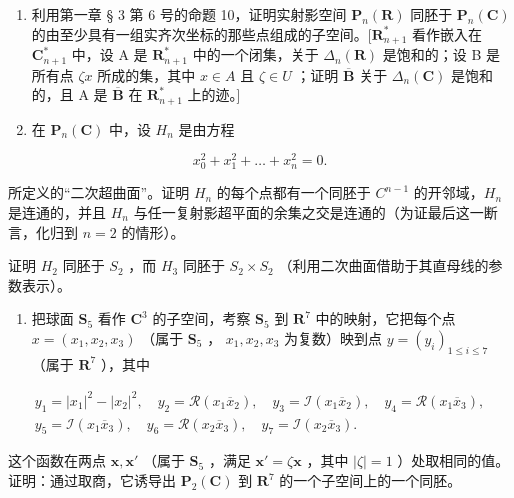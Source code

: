 \begin{enumerate}
\def\labelenumi{\arabic{enumi})}
\setcounter{enumi}{2}
\item
  利用第一章 § 3 第 6 号的命题 10，证明实射影空间 \(\mathbf{P}_{n}(\mathbf{R})\) 同胚于 \(\mathbf{P}_{n}(\mathbf{C})\) 的由至少具有一组实齐次坐标的那些点组成的子空间。\([\mathbf{R}_{n+1}^{*}\) 看作嵌入在 \(\mathbf{C}_{n+1}^{*}\) 中，设 A 是 \(\mathbf{R}_{n+1}^{*}\) 中的一个闭集，关于 \(\Delta_{n}(\mathbf{R})\) 是饱和的；设 B 是所有点 \(\zeta x\) 所成的集，其中 \(x \in A\) 且 \(\zeta \in U\) ；证明 \(\overline{\mathbf{B}}\) 关于 \(\Delta_{n}(\mathbf{C})\) 是饱和的，且 A 是 \(\overline{\mathbf{B}}\) 在 \(\mathbf{R}_{n+1}^{*}\) 上的迹。{]}
\item
  在 \(\mathbf{P}_{n}(\mathbf{C})\) 中，设 \(H_{n}\) 是由方程
\end{enumerate}

\[
x _ {0} ^ {2} + x _ {1} ^ {2} + \dots + x _ {n} ^ {2} = 0.
\]

所定义的“二次超曲面”。证明 \(H_{n}\) 的每个点都有一个同胚于 \(C^{n-1}\) 的开邻域，\(H_{n}\) 是连通的，并且 \(H_{n}\) 与任一复射影超平面的余集之交是连通的（为证最后这一断言，化归到 \(n = 2\) 的情形）。

证明 \(H_{2}\) 同胚于 \(S_{2}\) ，而 \(H_{3}\) 同胚于 \(S_{2} \times S_{2}\) （利用二次曲面借助于其直母线的参数表示）。

\begin{enumerate}
\def\labelenumi{\arabic{enumi})}
\setcounter{enumi}{4}
\tightlist
\item
  把球面 \(\mathbf{S}_5\) 看作 \(\mathbf{C}^3\) 的子空间，考察 \(\mathbf{S}_5\) 到 \(\mathbf{R}^7\) 中的映射，它把每个点 \(x = (x_1, x_2, x_3)\) （属于 \(\mathbf{S}_5\) ， \(x_1, x_2, x_3\) 为复数）映到点 \(y = (y_i)_{1 \leqslant i \leqslant 7}\) （属于 \(\mathbf{R}^7\) ），其中
\end{enumerate}

\[
\begin{array}{c} y _ {1} = | x _ {1} | ^ {2} - | x _ {2} | ^ {2}, \quad y _ {2} = \mathcal {R} (x _ {1} \overline {{x}} _ {2}), \quad y _ {3} = \mathcal {I} (x _ {1} \overline {{x}} _ {2}), \quad y _ {4} = \mathcal {R} (x _ {1} \overline {{x}} _ {3}), \\ y _ {5} = \mathcal {I} (x _ {1} \overline {{x}} _ {3}), \quad y _ {6} = \mathcal {R} (x _ {2} \overline {{x}} _ {3}), \quad y _ {7} = \mathcal {I} (x _ {2} \overline {{x}} _ {3}). \end{array}
\]

这个函数在两点 \(\pmb{x}, \pmb{x}'\) （属于 \(\mathbf{S}_5\) ，满足 \(\pmb{x}' = \zeta \pmb{x}\) ，其中 \(|\zeta| = 1\) ）处取相同的值。证明：通过取商，它诱导出 \(\mathbf{P}_2(\mathbf{C})\) 到 \(\mathbf{R}^7\) 的一个子空间上的一个同胚。

